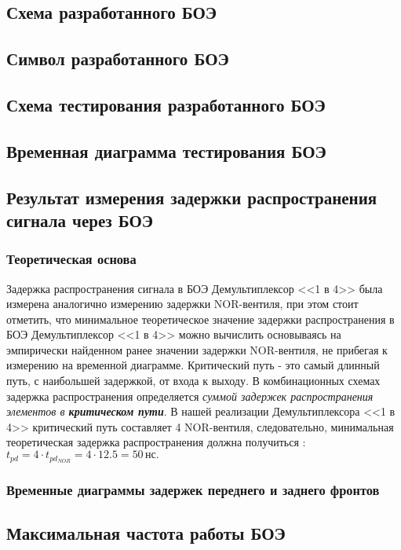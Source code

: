 \subsection{Схема разработанного БОЭ}


\subsection{Символ разработанного БОЭ}


\subsection{Схема тестирования разработанного БОЭ}


\subsection{Временная диаграмма тестирования БОЭ}


\subsection{Результат измерения задержки распространения сигнала через БОЭ}
\subsubsection{Теоретическая основа}
Задержка распространения сигнала в БОЭ Демультиплексор <<1 в 4>> была измерена аналогично измерению задержки NOR-вентиля, при этом стоит отметить, что минимальное теоретическое значение задержки распространения в БОЭ Демультиплексор <<1 в 4>> можно вычислить основываясь на эмпирически найденном ранее значении задержки NOR-вентиля, не прибегая к измерению на временной диаграмме. Критический путь - это самый длинный путь, с наибольшей задержкой, от входа к выходу. В комбинационных схемах задержка распространения определяется \textit{суммой задержек распространения элементов в \textbf{критическом пути}}. В нашей реализации Демультиплексора <<1 в 4>> критический путь составляет 4 NOR-вентиля, следовательно, минимальная теоретическая задержка распространения должна получиться : \(t_{pd} = 4 \cdot t_{pd_{NOR}} = 4 \cdot 12.5 = 50 \, \text{нс}.\)

\subsubsection{Временные диаграммы задержек переднего и заднего фронтов}


\subsection{Максимальная частота работы БОЭ}

